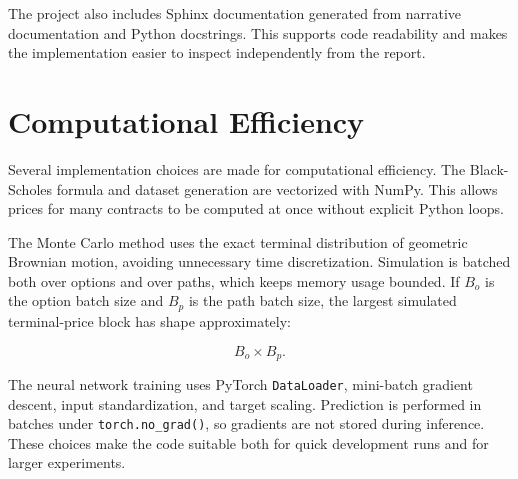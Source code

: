 The project also includes Sphinx documentation generated from narrative documentation and Python docstrings.
This supports code readability and makes the implementation easier to inspect independently from the report.

\section{Computational Efficiency}

Several implementation choices are made for computational efficiency.
The Black-Scholes formula and dataset generation are vectorized with NumPy.
This allows prices for many contracts to be computed at once without explicit Python loops.

The Monte Carlo method uses the exact terminal distribution of geometric Brownian motion, avoiding unnecessary time discretization.
Simulation is batched both over options and over paths, which keeps memory usage bounded.
If $B_o$ is the option batch size and $B_p$ is the path batch size, the largest simulated terminal-price block has shape approximately:

\begin{equation}
    B_o \times B_p.
\end{equation}

The neural network training uses PyTorch \texttt{DataLoader}, mini-batch gradient descent, input standardization, and target scaling.
Prediction is performed in batches under \texttt{torch.no\_grad()}, so gradients are not stored during inference.
These choices make the code suitable both for quick development runs and for larger experiments.
